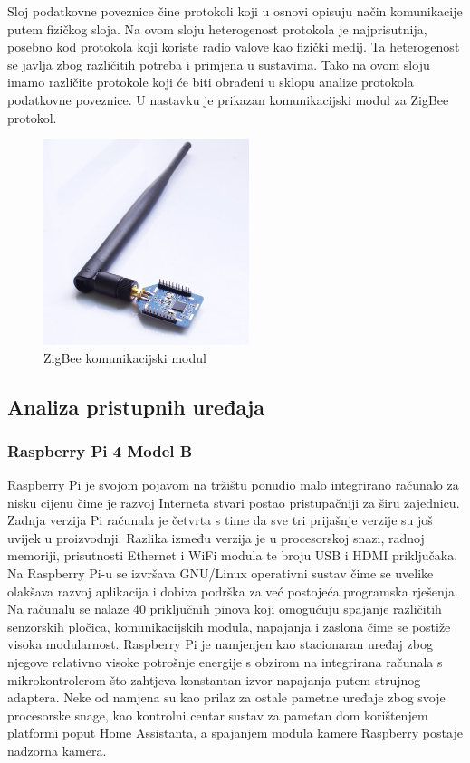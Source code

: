 \documentclass[times, utf8, diplomski]{fer}
\begin{document}
Sloj podatkovne poveznice čine protokoli koji u osnovi opisuju način komunikacije putem fizičkog sloja. Na ovom sloju heterogenost protokola je najprisutnija, posebno kod protokola koji koriste radio valove kao fizički medij. Ta heterogenost se javlja zbog različitih potreba i primjena u sustavima. Tako na ovom sloju imamo različite protokole koji će biti obrađeni u sklopu analize protokola podatkovne poveznice. U nastavku je prikazan komunikacijski modul za ZigBee protokol.
\begin{figure}[htb]
    \centering
    \includegraphics[width=6cm]{images/zigbee-module.jpg}
    \caption{ZigBee komunikacijski modul\citep{ZigBeemodule}}
    \label{fig:zigbeemodule}
\end{figure}

\subsection{Analiza pristupnih uređaja}
\subsubsection{Raspberry Pi 4 Model B}
Raspberry Pi je svojom pojavom na tržištu ponudio malo integrirano računalo za nisku cijenu čime je razvoj Interneta stvari postao pristupačniji za širu zajednicu. Zadnja verzija Pi računala je četvrta s time da sve tri prijašnje verzije su još uvijek u proizvodnji. Razlika između verzija je u procesorskoj snazi, radnoj memoriji, prisutnosti Ethernet i WiFi modula te broju USB i HDMI priključaka. Na Raspberry Pi-u se izvršava GNU/Linux operativni sustav čime se uvelike olakšava razvoj aplikacija i dobiva podrška za već postojeća programska rješenja. Na računalu se nalaze 40 priključnih pinova koji omogućuju spajanje različitih senzorskih pločica, komunikacijskih modula, napajanja i zaslona čime se postiže visoka modularnost. Raspberry Pi je namjenjen kao stacionaran uređaj zbog njegove relativno visoke potrošnje energije s obzirom na integrirana računala s mikrokontrolerom što zahtjeva konstantan izvor napajanja putem strujnog adaptera. Neke od namjena su kao prilaz za ostale pametne uređaje zbog svoje procesorske snage, kao kontrolni centar sustav za pametan dom korištenjem platformi poput Home Assistanta, a spajanjem modula kamere Raspberry postaje nadzorna kamera. 
\end{document}
